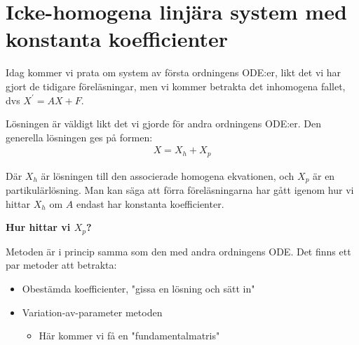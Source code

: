 \section{Icke-homogena linjära system med konstanta koefficienter}
\par\bigskip
\noindent Idag kommer vi prata om system av första ordningens ODE:er, likt det vi har gjort de tidigare föreläsningar, men vi kommer betrakta det inhomogena fallet, dvs $X^{\prime} = AX+F$.\par
\noindent Lösningen är väldigt likt det vi gjorde för andra ordningens ODE:er. Den generella lösningen ges på formen:
\begin{equation*}
  \begin{gathered}
    X = X_h+X_p
  \end{gathered}
\end{equation*}\par
\noindent Där $X_h$ är lösningen till den associerade homogena ekvationen, och $X_p$ är en partikulärlösning. Man kan säga att förra föreläsningarna har gått igenom hur vi hittar $X_h$ om $A$ endast har konstanta koefficienter.
\par\bigskip
\noindent\textbf{Hur hittar vi $X_p$?}
\par\bigskip
\noindent Metoden är i princip samma som den med andra ordningens ODE. Det finns ett par metoder att betrakta:
\begin{itemize}
  \item Obestämda koefficienter, "gissa en lösning och sätt in"
  \item Variation-av-parameter metoden
    \begin{itemize}
      \item Här kommer vi få en "fundamentalmatris"
    \end{itemize}
\end{itemize}
\par\bigskip
